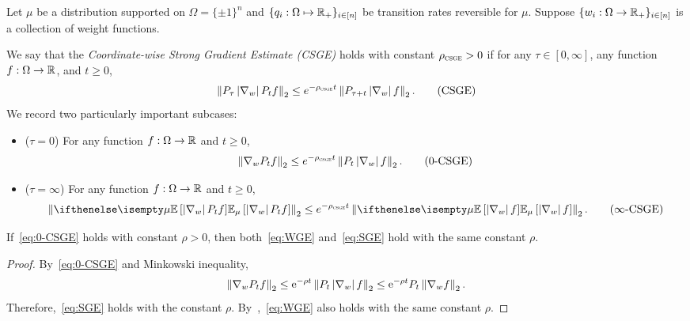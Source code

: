 \begin{definition}
    Let $\mu$ be a distribution supported on $\Omega = \{\pm 1\}^n$ and $\{q_i: \Omega \mapsto \mathbb{R}_+\}_{i\in[n]}$ be transition rates reversible for $\mu$.
    Suppose $\{w_i:\Omega \to \mathbb{R}_+\}_{i\in[n]}$ is a collection of weight functions. 
    
    We say that the \emph{Coordinate-wise Strong Gradient Estimate (CSGE)} holds with constant $\rho_{{\normalfont\textsc{csge}}} > 0$ if for any $\tau \in [0,\infty]$, any function $f: \Omega \to \mathbb{R}$, and $t\geq 0$, 
        \begin{align}\label{eq:CSGE}
            \left\lVert P_\tau \left\vert\nabla_w\right\vert P_t f \right\rVert_2 \leq e^{-\rho_{{\normalfont\textsc{csge}}} t}\left\lVert P_{\tau+t} \left\vert\nabla_w\right\vert f \right\rVert_2. \tag{CSGE}
        \end{align}
        We record two particularly important subcases:
        \begin{itemize}
            \item ($\tau = 0$) For any function $f: \Omega \to \mathbb{R}$ and $t\geq 0$,  
            \begin{align}\label{eq:0-CSGE}
                \left\lVert \nabla_w P_t f \right\rVert_2 \leq e^{-\rho_{{\normalfont\textsc{csge}}} t}\left\lVert P_t \left\vert\nabla_w\right\vert f \right\rVert_2. \tag{$0$-CSGE}
            \end{align}

            \item ($\tau = \infty$) For any function $f: \Omega \to \mathbb{R}$ and $t\geq 0$,  
            \begin{align}\label{eq:infty-CSGE}
                \norm{\E[\mu]{\abs{\nabla_w}P_t f}}_2 \leq e^{-\rho_{\CSGE} t}\norm{\E[\mu]{\abs{\nabla_w}f}}_2. \tag{$\infty$-CSGE}
            \end{align}
        \end{itemize}
\end{definition}

\begin{fact}
If~\ref{eq:0-CSGE} holds with constant $\rho > 0$, then both~\ref{eq:WGE} and~\ref{eq:SGE} hold with the same constant $\rho$.
\end{fact}

\begin{proof}
    By~\eqref{eq:0-CSGE} and Minkowski inequality,
    \begin{align*}
        \left\lVert \nabla_w P_t f \right\rVert_2 \le \mathrm{e}^{-\rho t} \left\lVert P_t \left\vert\nabla_w\right\vert f \right\rVert_2 \le \mathrm{e}^{-\rho t} P_t \left\lVert \nabla_w f \right\rVert_2.
    \end{align*}
    Therefore,~\eqref{eq:SGE} holds with the constant $\rho$. 
    By~,~\eqref{eq:WGE} also holds with the same constant $\rho$.
\end{proof}


